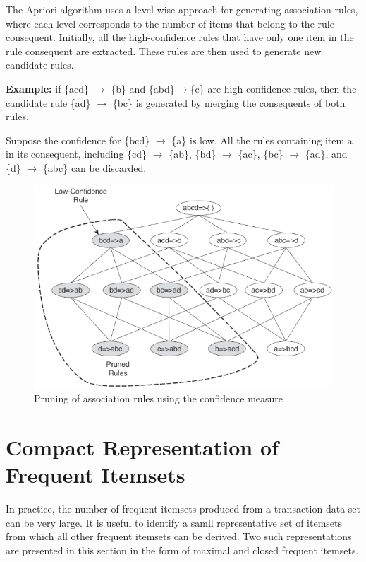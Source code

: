 		The Apriori algorithm uses a level-wise approach for generating association rules, 
		where each level corresponds to the number of items that belong to the rule 
		consequent. Initially, all the high-confidence rules that have only one item
		in the rule consequent are extracted. These rules are then used to generate
		new candidate rules.

		{\bf Example:} if \{acd\} $\rightarrow$ \{b\} and \{abd\}$\rightarrow$\{c\} are
		high-confidence rules, then the candidate rule \{ad\} $\rightarrow$ \{bc\} is
		generated by merging the consequents of both rules. 
		
		Suppose the confidence for \{bcd\} $\rightarrow$ \{a\} is low. All the rules
		containing item a in its consequent, including \{cd\} $\rightarrow$ \{ab\},
		\{bd\} $\rightarrow$ \{ac\}, \{bc\} $\rightarrow$ \{ad\}, and \{d\} $\rightarrow$ \{abc\}
		can be discarded.

		\begin{figure}[H]
			\centering
			\includegraphics[width=\textwidth]{pics/prune.png}
			\caption{Pruning of association rules using the confidence measure}
		\end{figure}

	\clearpage
	\section{Compact Representation of Frequent Itemsets}
		In practice, the number of frequent itemsets produced from a transaction data set
		can be very large. It is useful to identify a samll representative set of itemsets
		from which all other frequent itemsets can be derived. 
		Two such representations are presented in this section in the form of maximal and
		closed frequent itemsets.


